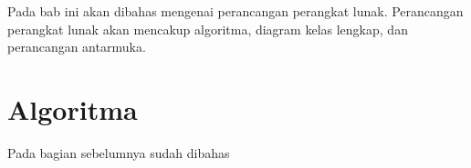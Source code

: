\label{chap:perancangan}

Pada bab ini akan dibahas mengenai perancangan perangkat lunak. Perancangan perangkat lunak akan mencakup algoritma, diagram kelas lengkap, dan perancangan antarmuka.

\section{Algoritma}

Pada bagian sebelumnya sudah dibahas 